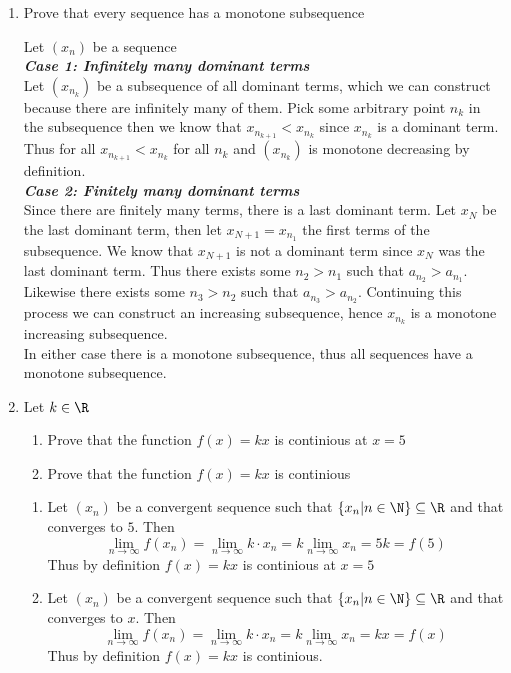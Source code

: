 \documentclass[11pt]{exam}
\begin{document}
    \begin{enumerate}
        \item Prove that every sequence has a monotone subsequence
        \begin{solution}
            Let $(x_n)$ be a sequence \\
            \textbf{\textit{Case 1: Infinitely many dominant terms}} \\
            Let $(x_{n_k})$ be a subsequence of all dominant terms, which we can construct because 
            there are infinitely many of them. Pick some arbitrary point $n_k$ in the subsequence
            then we know that $x_{n_{k+1}} < x_{n_k}$ since $x_{n_k}$ is a dominant term. Thus for all 
            $x_{n_{k+1}} < x_{n_k}$ for all $n_k$ and $(x_{n_k})$ is monotone decreasing by definition. \\
            \textbf{\textit{Case 2: Finitely many dominant terms}} \\
            Since there are finitely many terms, there is a last dominant term. Let $x_N$ be the last dominant term, 
            then let $x_{N+1} = x_{n_1}$ the first terms of the subsequence. We know that $x_{N+1}$ is not a dominant 
            term since $x_N$ was the last dominant term. Thus there exists some $n_2 > n_1$ such that $a_{n_2} > a_{n_1}$.
            Likewise there exists some $n_3 > n_2$ such that $a_{n_3} > a_{n_2}$. Continuing this process we can construct
            an increasing subsequence, hence $x_{n_k}$ is a monotone increasing subsequence. \\
            In either case there is a monotone subsequence, thus all sequences have a monotone subsequence.
        \end{solution}    
        \item Let $k \in \R$             
            \begin{enumerate}
                \item Prove that the function $f(x) = kx$ is continious at $x=5$
                \item Prove that the function $f(x) = kx$ is continious
            \end{enumerate}
        \begin{solution}
            \begin{enumerate}
                \item Let $(x_n)$ be a convergent sequence such that $\{x_n | n \in \N\} \subseteq \R$ and that 
                converges to $5$. Then 
                $$\lim_{n \to \infty} f(x_n) = \lim_{n \to \infty} k \cdot x_n = k \lim_{n \to \infty} x_n = 5k = f(5)$$
                Thus by definition $f(x) = kx$ is continious at $x = 5$
                \item Let $(x_n)$ be a convergent sequence such that $\{x_n | n \in \N\} \subseteq \R$ and that 
                converges to $x$. Then
                $$\lim_{n \to \infty} f(x_n) = \lim_{n \to \infty} k \cdot x_n = k \lim_{n \to \infty} x_n = kx = f(x)$$
                Thus by definition $f(x) = kx$ is continious.
            \end{enumerate}
        \end{solution}
        
    \end{enumerate}
\end{document}
